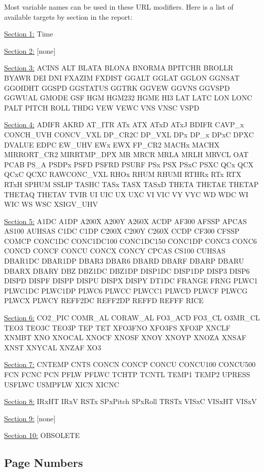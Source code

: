 \documentclass[
  english,
]{book}
\begin{document}
Most variable names can be used in these URL modifiers. Here is a list of available targets by section in the report:

\underline{Section 1:} Time

\underline{Section 2:} {{[}none{]}}

\underline{Section 3:} ACINS ALT BLATA BLONA BNORMA BPITCHR BROLLR BYAWR DEI DNI FXAZIM FXDIST GGALT GGLAT GGLON GGNSAT GGOIDHT GGSPD GGSTATUS GGTRK GGVEW GGVNS GGVSPD GGWUAL GMODE GSF HGM HGM232 HGME HI3 LAT LATC LON LONC PALT PITCH ROLL THDG VEW VEWC VNS VNSC VSPD

\underline{Section 4:} ADIFR AKRD AT\_ITR ATx ATX ATxD ATxJ BDIFR CAVP\_x CONCH\_UVH CONCV\_VXL DP\_CR2C DP\_VXL DPx DP\_x DPxC DPXC DVALUE EDPC EW\_UHV EWx EWX FP\_CR2 MACHx MACHX MIRRORT\_CR2 MIRRTMP\_DPX MR MRCR MRLA MRLH MRVCL OAT PCAB PS\_A PSDPx PSFD PSFRD PSURF PSx PSX PSxC PSXC QCx QCX QCxC QCXC RAWCONC\_VXL RHOx RHUM RHUMI RTHRx RTx RTX RTxH SPHUM SSLIP TASHC TASx TASX TASxD THETA THETAE THETAP THETAQ THETAV TVIR UI UIC UX UXC VI VIC VY VYC WD WDC WI WIC WS WSC XSIGV\_UHV

\underline{Section 5:} A1DC A1DP A200X A200Y A260X ACDP AF300 AFSSP APCAS AS100 AUHSAS C1DC C1DP C200X C200Y C260X CCDP CF300 CFSSP COMCP CONC1DC CONC1DC100 CONC1DC150 CONC1DP CONC3 CONC6 CONCD CONCF CONCU CONCX CONCY CPCAS CS100 CUHSAS DBAR1DC DBAR1DP DBAR3 DBAR6 DBARD DBARF DBARP DBARU DBARX DBARY DBZ DBZ1DC DBZ1DP DISP1DC DISP1DP DISP3 DISP6 DISPD DISPF DISPP DISPU DISPX DISPY DT1DC FRANGE FRNG PLWC1 PLWC1DC PLWC1DP PLWC6 PLWCC PLWCC1 PLWCD PLWCF PLWCG PLWCX PLWCY REFF2DC REFF2DP REFFD REFFF RICE

\underline{Section 6:} CO2\_PIC COMR\_AL CORAW\_AL FO3\_ACD FO3\_CL O3MR\_CL TEO3 TEO3C TEO3P TEP TET XFO3FNO XFO3FS XFO3P XNCLF XNMBT XNO XNOCAL XNOCF XNOSF XNOY XNOYP XNOZA XNSAF XNST XNYCAL XNZAF XO3

\underline{Section 7:} CNTEMP CNTS CONCN CONCP CONCU CONCU100 CONCU500 FCN FCNC PCN PFLW PFLWC TCHTP TCNTL TEMP1 TEMP2 UPRESS USFLWC USMPFLW XICN XICNC

\underline{Section 8:} IRxHT IRxV RSTx SPxPitch SPxRoll TRSTx VISxC VISxHT VISxV

\underline{Section 9:} {{[}none{]}}

\underline{Section 10:} OBSOLETE

\hypertarget{page-numbers}{%
\subsection*{Page Numbers}\label{page-numbers}}
\end{document}
